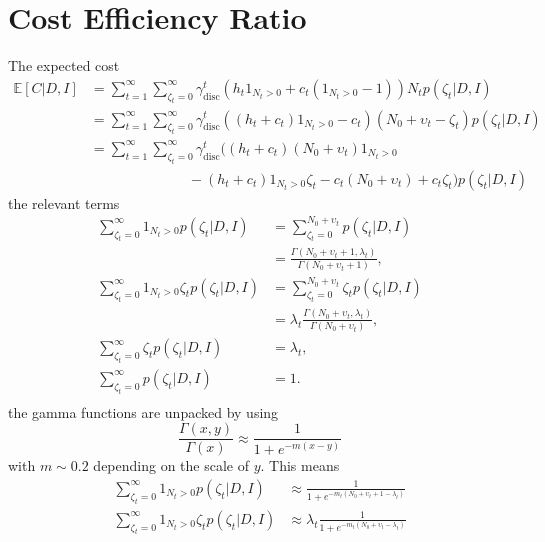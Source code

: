 \section{Cost Efficiency Ratio}
\label{app:cer}
The expected cost
\begin{equation}
	\begin{split}
		\mathbb{E}[C|D,I] &= \sum_{t=1}^{\infty}\sum_{\zeta_t=0}^\infty \gamma_{\text{disc}}^{t} \left( h_t 1_{N_t> 0} + c_t (1_{N_t> 0}-1) \right)N_tp(\zeta_t| D, I)\\
		&= \sum_{t=1}^{\infty}\sum_{\zeta_t=0}^\infty \gamma_{\text{disc}}^{t} \left( (h_t+c_t) 1_{N_t> 0} - c_t  \right)(N_0 + \upsilon_t-\zeta_t)p(\zeta_t| D, I)\\
		&= \sum_{t=1}^{\infty}\sum_{\zeta_t=0}^\infty \gamma_{\text{disc}}^{t} \bigg( 
		(h_t+c_t)(N_0 + \upsilon_t)1_{N_t> 0}\\
		&\qquad\qquad\qquad\quad-(h_t+c_t) 1_{N_t> 0}\zeta_t
		- c_t(N_0 + \upsilon_t)+c_t\zeta_t\bigg)p(\zeta_t| D, I)
	\end{split}
\end{equation}
the relevant terms
\begin{equation}
	\begin{split}
		\sum_{\zeta_t=0}^\infty1_{N_t> 0}p(\zeta_t| D, I) & = \sum_{\zeta_t=0}^{N_0+\upsilon_t} p(\zeta_t| D, I)\\
		&= \frac{\Gamma(N_0+\upsilon_t+1,\lambda_t)}{\Gamma(N_0+\upsilon_t+1)},\\
		\sum_{\zeta_t=0}^\infty1_{N_t> 0}\zeta_tp(\zeta_t| D, I) & = \sum_{\zeta_t=0}^{N_0+\upsilon_t} \zeta_t p(\zeta_t| D, I)\\
		& = \lambda_t \frac{\Gamma(N_0+\upsilon_t,\lambda_t)}{\Gamma(N_0+\upsilon_t)},\\
		\sum_{\zeta_t=0}^\infty\zeta_tp(\zeta_t| D, I) & = \lambda_t,\\
		\sum_{\zeta_t=0}^\infty p(\zeta_t| D, I) & = 1.\\
	\end{split}
\end{equation}
the gamma functions are unpacked by using 
\begin{equation}
	\frac{\Gamma(x,y)}{\Gamma(x)}\approx \frac{1}{1+e^{-m(x-y)}}
\end{equation}
with $m\sim 0.2$ depending on the scale of $y$. This means
\begin{equation}
	\begin{split}
		\sum_{\zeta_t=0}^\infty1_{N_t> 0}p(\zeta_t| D, I) & \approx \frac{1}{1+e^{-m_t(N_0+\upsilon_t+1-\lambda_t)}}\\
		\sum_{\zeta_t=0}^\infty1_{N_t> 0}\zeta_tp(\zeta_t| D, I) & \approx \lambda_t\frac{1}{1+e^{-m_t(N_0+\upsilon_t-\lambda_t)}}\\
	\end{split}
\end{equation}

